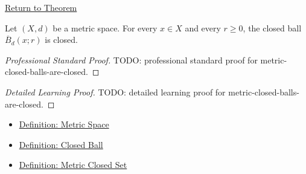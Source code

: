 \newpage
{}
\label{prf:metric-closed-balls-are-closed}

\begin{remark*}[Return]
\hyperref[thm:metric-closed-balls-are-closed]{Return to Theorem}
\end{remark*}

\begin{theorem*}
Let \((X,d)\) be a metric space.  For every \(x\in X\) and every \(r\geq 0\),
the closed ball \(\overline{B}_d(x;r)\) is closed.
\end{theorem*}

\begin{proof}[Professional Standard Proof]
\LRAProofBodyStart
TODO: professional standard proof for metric-closed-balls-are-closed.
\end{proof}

\begin{proof}[Detailed Learning Proof]
\LRAProofBodyStart
TODO: detailed learning proof for metric-closed-balls-are-closed.
\end{proof}

\begin{remark*}
\end{remark*}

\begin{dependencies}
\begin{itemize}
  \item \hyperref[def:metric-space]{Definition: Metric Space}
  \item \hyperref[def:metric-closed-ball]{Definition: Closed Ball}
  \item \hyperref[def:metric-closed-set]{Definition: Metric Closed Set}
\end{itemize}
\end{dependencies}

\clearpage

